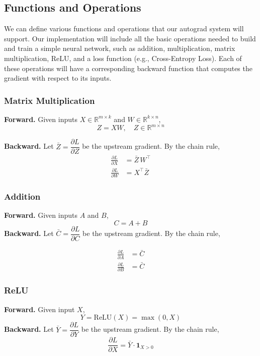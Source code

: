 \documentclass{article}
\begin{document}
\subsection{Functions and Operations}

We can define various functions and operations that our autograd system will support. Our implementation will include all the basic operations needed to build and train a simple neural network, such as addition, multiplication, matrix multiplication, ReLU, and a loss function (e.g., Cross-Entropy Loss). Each of these operations will have a corresponding backward function that computes the gradient with respect to its inputs.

\subsubsection{Matrix Multiplication}

\textbf{Forward.} Given inputs $X \in \mathbb{R}^{m \times k}$ and $W \in \mathbb{R}^{k \times n}$,
\[
    Z = XW, \quad Z \in \mathbb{R}^{m \times n}
\]

\textbf{Backward.} Let $\bar{Z} = \dfrac{\partial L}{\partial Z}$ be the upstream gradient. By the chain rule,
\begin{align}
    \frac{\partial L}{\partial X} &= \bar{Z}\, W^\top \\
    \frac{\partial L}{\partial W} &= X^\top \bar{Z}
\end{align}

\subsubsection{Addition}
\textbf{Forward.} Given inputs $A$ and $B$, 
\[
    C = A + B
\]
\textbf{Backward.} Let $\bar{C} = \dfrac{\partial L}{\partial C}$ be the upstream gradient. By the chain rule,

\begin{align}
    \frac{\partial L}{\partial A} &= \bar{C} \\
    \frac{\partial L}{\partial B} &= \bar{C}
\end{align}
\subsubsection{ReLU}
\textbf{Forward.} Given input $X$,
\[
    Y = \text{ReLU}(X) = \max(0, X)
\]
\textbf{Backward.} Let $\bar{Y} = \dfrac{\partial L}{\partial Y}$ be the upstream gradient. By the chain rule,
\[
    \frac{\partial L}{\partial X} = \bar{Y} \cdot \mathbf{1}_{X > 0}
\]
\end{document}
